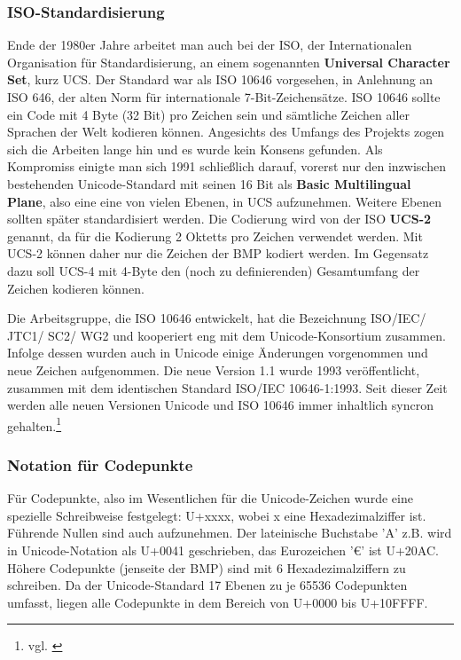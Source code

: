 \subsubsection{ISO-Standardisierung}
Ende der 1980er Jahre arbeitet man auch bei der ISO, der Internationalen Organisation für Standardisierung, an einem sogenannten \textbf{Universal Character Set}, kurz UCS. Der Standard war als ISO 10646 vorgesehen, in Anlehnung an ISO 646, der alten Norm für internationale 7-Bit-Zeichensätze. ISO 10646 sollte ein Code mit 4 Byte (32 Bit) pro Zeichen sein und sämtliche Zeichen aller Sprachen der Welt kodieren können. Angesichts des Umfangs des Projekts zogen sich die Arbeiten lange hin und es wurde kein Konsens gefunden. Als Kompromiss einigte man sich 1991 schließlich darauf, vorerst nur den inzwischen bestehenden Unicode-Standard mit seinen 16 Bit als \textbf{Basic Multilingual Plane}, also eine eine von vielen Ebenen, in UCS aufzunehmen. Weitere Ebenen sollten später standardisiert werden. Die Codierung wird von der ISO \textbf{UCS-2} genannt, da für die Kodierung 2 Oktetts pro Zeichen verwendet werden. Mit UCS-2 können daher nur die Zeichen der BMP kodiert werden. Im Gegensatz dazu soll UCS-4 mit 4-Byte den (noch zu definierenden) Gesamtumfang der Zeichen kodieren können.

Die Arbeitsgruppe, die ISO 10646 entwickelt, hat die Bezeichnung ISO/IEC/ JTC1/ SC2/ WG2 und kooperiert eng mit dem Unicode-Konsortium zusammen. Infolge dessen wurden auch in Unicode einige Änderungen vorgenommen und neue Zeichen aufgenommen. Die neue Version 1.1 wurde 1993 veröffentlicht, zusammen mit dem identischen Standard ISO/IEC 10646-1:1993. Seit dieser Zeit werden alle neuen Versionen Unicode und ISO 10646 immer inhaltlich syncron gehalten.\footnote{vgl. \cite{UC2014C}}

\subsubsection{Notation für Codepunkte}
Für Codepunkte, also im Wesentlichen für die Unicode-Zeichen wurde eine spezielle Schreibweise festgelegt: U+xxxx, wobei x eine Hexadezimalziffer ist. Führende Nullen sind auch aufzunehmen. Der lateinische Buchstabe 'A' z.B. wird in Unicode-Notation als U+0041 geschrieben, das Eurozeichen '€' ist  U+20AC. Höhere Codepunkte (jenseite der BMP) sind mit 6 Hexadezimalziffern zu schreiben. Da der Unicode-Standard 17 Ebenen zu je 65536 Codepunkten umfasst, liegen alle Codepunkte in dem Bereich von U+0000 bis U+10FFFF.

